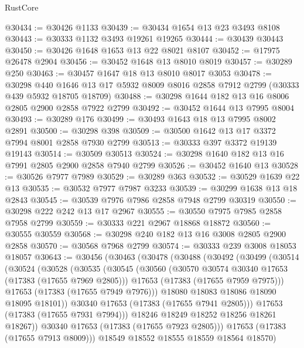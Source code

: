 \begin{lexlean}{RustCore}
\begin{coremodule}
@30434 := @30426 @1133
@30439 := @30434 @1654 @13 @23 @3493 @8108
@30443 := @30333 @1132 @3493 @19261 @19265
@30444 := @30439 @30443
@30450 := @30426 @1648 @1653 @13 @22 @8021 @8107
@30452 := @17975 @26478 @2904
@30456 := @30452 @1648 @13 @8010 @8019
@30457 := @30289 @250
@30463 := @30457 @1647 @18 @13 @8010 @8017 @3053
@30478 := @30298
    @440
    @1646
    @13
    @17
    @5932
    @8009
    @8016
    @2858
    @7912
    @2799
    (@30333 @439 @5932 @18705 @18709)
@30488 := @30298 @1644 @182 @13 @16 @8006 @2805 @2900 @2858 @7922 @2799
@30492 := @30452 @1644 @13 @7995 @8004
@30493 := @30289 @176
@30499 := @30493 @1643 @18 @13 @7995 @8002 @2891
@30500 := @30298 @398
@30509 := @30500 @1642 @13 @17 @3372 @7994 @8001 @2858 @7930 @2799
@30513 := @30333 @397 @3372 @19139 @19143
@30514 := @30509 @30513
@30524 := @30298 @1640 @182 @13 @16 @7991 @2805 @2900 @2858 @7940 @2799
@30526 := @30452 @1640 @13
@30528 := @30526 @7977 @7989
@30529 := @30289 @363
@30532 := @30529 @1639 @22 @13
@30535 := @30532 @7977 @7987 @3233
@30539 := @30299 @1638 @13 @18 @2843
@30545 := @30539 @7976 @7986 @2858 @7948 @2799 @30319
@30550 := @30298 @222 @242 @13 @17 @2967
@30555 := @30550 @7975 @7985 @2858 @7958 @2799
@30559 := @30333 @221 @2967 @18868 @18872
@30560 := @30555 @30559
@30568 := @30298 @240 @182 @13 @16 @3008 @2805 @2900 @2858
@30570 := @30568 @7968 @2799
@30574 := @30333 @239 @3008 @18053 @18057
@30643 := @30456
    (@30463
      (@30478
        (@30488
          (@30492
            (@30499
              (@30514
                (@30524
                  (@30528
                    (@30535
                      (@30545
                        (@30560
                          (@30570 @30574 @30340 @17653 (@17383 (@17655 @7969 @2805)))
                          @17653
                          (@17383 (@17655 @7959 @7975)))
                        @17653
                        (@17383 (@17655 @7949 @7976)))
                      @18080
                      @18083
                      @18086
                      @18090
                      @18095
                      @18101))
                  @30340
                  @17653
                  (@17383 (@17655 @7941 @2805)))
                @17653
                (@17383 (@17655 @7931 @7994)))
              @18246
              @18249
              @18252
              @18256
              @18261
              @18267))
          @30340
          @17653
          (@17383 (@17655 @7923 @2805)))
        @17653
        (@17383 (@17655 @7913 @8009)))
      @18549
      @18552
      @18555
      @18559
      @18564
      @18570)

\end{coremodule}
\end{lexlean}
